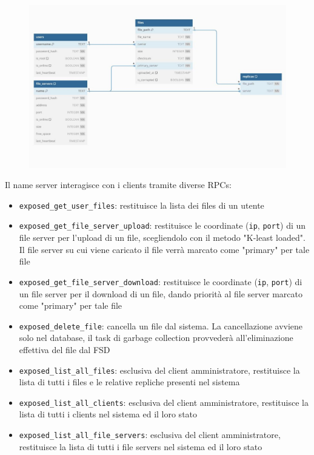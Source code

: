 \documentclass[a4paper, 12pt]{scrreprt}
\begin{document}
            \begin{figure}[H]
                \centering
                \includegraphics[width = 1. \textwidth]{img/ERD.jpg}
            \end{figure}

            Il name server interagisce con i clients tramite diverse RPCs:

            \begin{itemize}

                \item \texttt{exposed\_get\_user\_files}: restituisce la lista dei files di un utente

                \item \texttt{exposed\_get\_file\_server\_upload}: restituisce le coordinate (\texttt{ip}, \texttt{port}) di un file server per l'upload di un file, scegliendolo con il metodo "K-least loaded". Il file server su cui viene caricato il file verrà marcato come "primary" per tale file

                \item \texttt{exposed\_get\_file\_server\_download}: restituisce le coordinate (\texttt{ip}, \texttt{port}) di un file server per il download di un file, dando priorità al file server marcato come "primary" per tale file

                \item \texttt{exposed\_delete\_file}: cancella un file dal sistema. La cancellazione avviene solo nel database, il task di garbage collection provvederà all'eliminazione effettiva del file dal FSD

                \item \texttt{exposed\_list\_all\_files}: esclusiva del client amministratore, restituisce la lista di tutti i files e le relative repliche presenti nel sistema

                \item \texttt{exposed\_list\_all\_clients}: esclusiva del client amministratore, restituisce la lista di tutti i clients nel sistema ed il loro stato

                \item \texttt{exposed\_list\_all\_file\_servers}: esclusiva del client amministratore, restituisce la lista di tutti i file servers nel sistema ed il loro stato

            \end{itemize}
\end{document}
